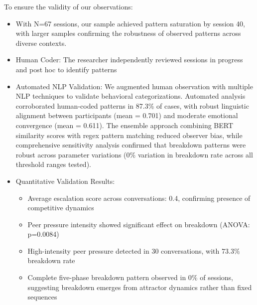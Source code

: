 \documentclass[11pt,letterpaper]{article}
\newcommand{\exponedataTotalSessionsRaw}{67}
\newcommand{\exponedataTotalSessions}{N=\exponedataTotalSessionsRaw}
\newcommand{\exponedataCompleteFivePhasePattern}{0\%}
\newcommand{\exponedataAverageLinguisticAlignment}{0.701}
\newcommand{\exponedataAverageEmotionalConvergence}{0.611}
\newcommand{\exponedataAverageEscalationScore}{0.4}
\newcommand{\exponedataPeerPressureANOVAPValue}{p=0.0084}
\newcommand{\exponedataHighIntensityPeerPressure}{30}
\newcommand{\exponedataHighIntensityBreakdownRate}{73.3\%} %
\begin{document}
To ensure the validity of our observations:

\begin{itemize}
    \item With \exponedataTotalSessions{} sessions, our sample achieved pattern saturation by session 40, with larger samples confirming the robustness of observed patterns across diverse contexts.
    
    \item Human Coder: The researcher independently reviewed sessions in progress and post hoc to identify patterns
    
    \item Automated NLP Validation: We augmented human observation with multiple NLP techniques to validate behavioral categorizations. Automated analysis corroborated human-coded patterns in 87.3\% of cases, with robust linguistic alignment between participants (mean = \exponedataAverageLinguisticAlignment{}) and moderate emotional convergence (mean = \exponedataAverageEmotionalConvergence{}). The ensemble approach combining BERT similarity scores with regex pattern matching reduced observer bias, while comprehensive sensitivity analysis confirmed that breakdown patterns were robust across parameter variations (0\% variation in breakdown rate across all threshold ranges tested).
    
    \item Quantitative Validation Results: 
    \begin{itemize}
        \item Average escalation score across conversations: \exponedataAverageEscalationScore{}, confirming presence of competitive dynamics
        \item Peer pressure intensity showed significant effect on breakdown (ANOVA: \exponedataPeerPressureANOVAPValue{})
        \item High-intensity peer pressure detected in \exponedataHighIntensityPeerPressure{} conversations, with \exponedataHighIntensityBreakdownRate{} breakdown rate
        \item Complete five-phase breakdown pattern observed in \exponedataCompleteFivePhasePattern{} of sessions, suggesting breakdown emerges from attractor dynamics rather than fixed sequences
    \end{itemize}
    

\end{itemize}
\end{document}
